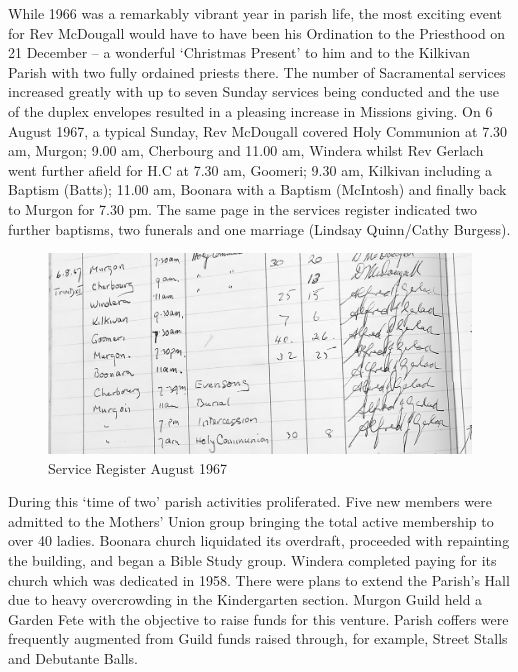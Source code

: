 While 1966 was a remarkably vibrant year in parish life, the most exciting event for Rev McDougall would have to have been his Ordination to the Priesthood on 21 December -- a wonderful `Christmas Present' to him and to the Kilkivan Parish with two fully ordained priests there. The number of Sacramental services increased greatly with up to seven Sunday services being conducted and the use of the duplex envelopes resulted in a pleasing increase in Missions giving. On 6 August 1967, a typical Sunday, Rev McDougall covered Holy Communion at 7.30 am, Murgon; 9.00 am, Cherbourg and 11.00 am, Windera whilst Rev Gerlach went further afield for H.C at 7.30 am, Goomeri; 9.30 am, Kilkivan including a Baptism (Batts); 11.00 am, Boonara with a Baptism (McIntosh) and finally back to Murgon for 7.30 pm. The same page in the services register indicated two further baptisms, two funerals and one marriage (Lindsay Quinn/Cathy Burgess).









\begin{figure}[!htb]
\begin{center}
\includegraphics[width=1.\textwidth,center]{../images/serviceRegisterAug1967.jpg}
\caption{Service Register August 1967}
\end{center}
\end{figure}




During this `time of two' parish activities proliferated. Five new members were admitted to the Mothers' Union group bringing the total active membership to over 40 ladies. Boonara church liquidated its overdraft, proceeded with repainting the building, and began a Bible Study group. Windera completed paying for its church which was dedicated in 1958. There were plans to extend the Parish's Hall due to heavy overcrowding in the Kindergarten section. Murgon Guild held a Garden Fete with the objective to raise funds for this venture. Parish coffers were frequently augmented from Guild funds raised through, for example, Street Stalls and Debutante Balls.



